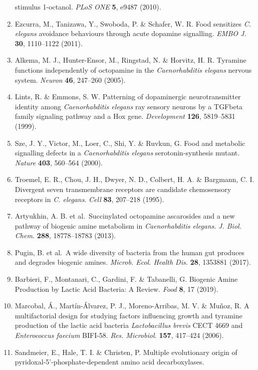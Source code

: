 \documentclass[11pt,]{article}
\begin{document}
\begin{enumerate}
  stimulus 1-octanol. \emph{PLoS ONE} \textbf{5}, e9487 (2010).
\item
  Ezcurra, M., Tanizawa, Y., Swoboda, P. \& Schafer, W. R. Food
  sensitizes \emph{C. elegans} avoidance behaviours through acute
  dopamine signalling. \emph{EMBO J.} \textbf{30}, 1110--1122 (2011).
\item
  Alkema, M. J., Hunter-Ensor, M., Ringstad, N. \& Horvitz, H. R.
  Tyramine functions independently of octopamine in the
  \emph{Caenorhabditis elegans} nervous system. \emph{Neuron}
  \textbf{46}, 247--260 (2005).
\item
  Lints, R. \& Emmons, S. W. Patterning of dopaminergic neurotransmitter
  identity among \emph{Caenorhabditis elegans} ray sensory neurons by a
  TGFbeta family signaling pathway and a Hox gene. \emph{Development}
  \textbf{126}, 5819--5831 (1999).
\item
  Sze, J. Y., Victor, M., Loer, C., Shi, Y. \& Ruvkun, G. Food and
  metabolic signalling defects in a \emph{Caenorhabditis elegans}
  serotonin-synthesis mutant. \emph{Nature} \textbf{403}, 560--564
  (2000).
\item
  Troemel, E. R., Chou, J. H., Dwyer, N. D., Colbert, H. A. \& Bargmann,
  C. I. Divergent seven transmembrane receptors are candidate
  chemosensory receptors in \emph{C. elegans}. \emph{Cell} \textbf{83},
  207--218 (1995).
\item
  Artyukhin, A. B. et al.~Succinylated octopamine ascarosides and a new
  pathway of biogenic amine metabolism in \emph{Caenorhabditis elegans}.
  \emph{J. Biol. Chem.} \textbf{288}, 18778--18783 (2013).
\item
  Pugin, B. et al.~A wide diversity of bacteria from the human gut
  produces and degrades biogenic amines. \emph{Microb. Ecol. Health
  Dis.} \textbf{28}, 1353881 (2017).
\item
  Barbieri, F., Montanari, C., Gardini, F. \& Tabanelli, G. Biogenic
  Amine Production by Lactic Acid Bacteria: A Review. \emph{Food}
  \textbf{8}, 17 (2019).
\item
  Marcobal, Á., Martín-Álvarez, P. J., Moreno-Arribas, M. V. \& Muñoz,
  R. A multifactorial design for studying factors influencing growth and
  tyramine production of the lactic acid bacteria \emph{Lactobacillus
  brevis} CECT 4669 and \emph{Enterococcus faecium} BIFI-58. \emph{Res.
  Microbiol.} \textbf{157}, 417--424 (2006).
\item
  Sandmeier, E., Hale, T. I. \& Christen, P. Multiple evolutionary
  origin of pyridoxal-5'-phosphate-dependent amino acid decarboxylases.

\end{enumerate}
\end{document}
